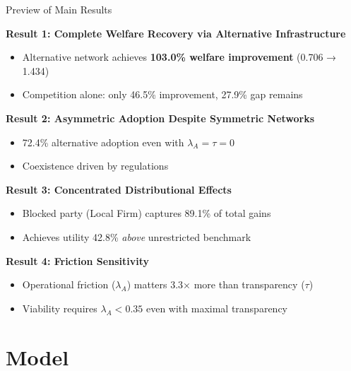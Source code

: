 \documentclass[aspectratio=169]{beamer}
\begin{document}
\begin{frame}{Preview of Main Results}
    
    \textbf{Result 1: Complete Welfare Recovery via Alternative Infrastructure}
    \begin{itemize}
        \item Alternative network achieves \textcolor{SafeGreen}{\textbf{103.0\% welfare improvement}} (0.706 → 1.434)
        \item Competition alone: only 46.5\% improvement, \textcolor{AlertRed}{27.9\% gap remains}
    \end{itemize}
    
    \vspace{0.3cm}
    \textbf{Result 2: Asymmetric Adoption Despite Symmetric Networks}
    \begin{itemize}
        \item 72.4\% alternative adoption even with $\lambda_A = \tau = 0$
        \item Coexistence driven by regulations
    \end{itemize}
    
    \vspace{0.3cm}
    \textbf{Result 3: Concentrated Distributional Effects}
    \begin{itemize}
        \item Blocked party (Local Firm) captures 89.1\% of total gains
        \item Achieves utility 42.8\% \textit{above} unrestricted benchmark
    \end{itemize}
    
    \vspace{0.3cm}
    \textbf{Result 4: Friction Sensitivity}
    \begin{itemize}
        \item Operational friction ($\lambda_A$) matters 3.3× more than transparency ($\tau$)
        \item Viability requires $\lambda_A < 0.35$ even with maximal transparency
    \end{itemize}

\end{frame}

\section{Model}
\end{document}
